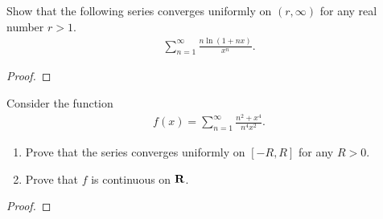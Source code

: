 \documentclass[11pt,twoside,openany]{memoir}
\begin{document}
\newpage
\fancyhead[L]{\scalebox{0.9}{Series of Functions}}
\fancyhead[R]{\scalebox{0.9}{Appeared on: S19}}
\begin{problem}
    Show that the following series converges uniformly on $(r,\infty)$ for any real number $r>1$.
    \begin{equation*}
    \begin{split}
        \sum_{n = 1}^\infty \frac{n \ln (1+nx)}{x^n}.
    \end{split}
    \end{equation*}
\end{problem}
\begin{proof}
\end{proof}

\newpage
\fancyhead[L]{\scalebox{0.9}{Series of Functions}}
\fancyhead[R]{\scalebox{0.9}{Appeared on: W19}}
\begin{problem}
    Consider the function
        \begin{equation*}
        \begin{split}
            f(x) = \sum_{n = 1}^\infty \frac{n^2 + x^4}{n^4 x^2}.
        \end{split}
        \end{equation*}
    \begin{enumerate}[label = (\arabic*)]
        \item Prove that the series converges uniformly on $[-R,R]$ for any $R > 0$.
        \item Prove that $f$ is continuous on $\mathbf{R}$.
    \end{enumerate}
\end{problem}
\begin{proof}
\end{proof}
\end{document}
